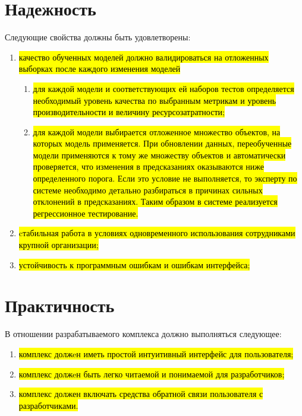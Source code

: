 \section{Надежность}
Следующие свойства должны быть удовлетворены:
\begin{enumerate}
    \item  \hl{качество обученных моделей должно валидироваться на отложенных выборках после каждого изменения моделей}
        \begin{enumerate}
            \item \hl{для каждой модели и соответствующих ей наборов тестов определяется необходимый уровень качества по выбранным метрикам и уровень производительности и величину ресурсозатратности;}
            \item \hl{для каждой модели выбирается отложенное множество объектов, на которых модель применяется. При обновлении данных, переобученные модели применяются к тому же множеству объектов и автоматически проверяется, что изменения в предсказаниях оказываются ниже определенного порога. Если это условие не выполняется, то эксперту по системе необходимо детально разбираться в причинах сильных отклонений в предсказаниях. Таким образом в системе реализуется регрессионное тестирование.}
        \end{enumerate}
    \item  \hl{cтабильная работа в условиях одновременного использования сотрудниками крупной организации;}
    \item  \hl{устойчивость к программным ошибкам и ошибкам интерфейса;}
\end{enumerate}
\section{Практичность}
В отношении разрабатываемого комплекса должно выполняться следующее:
\begin{enumerate}
    \item  \hl{комплекс должeн иметь простой интуитивный интерфейс для пользователя;}
    \item  \hl{комплекс должeн быть легко читаемой и понимаемой для разработчиков;}
    \item  \hl{комплекс должен включать средства обратной связи пользователя с разработчиками.}
\end{enumerate}
